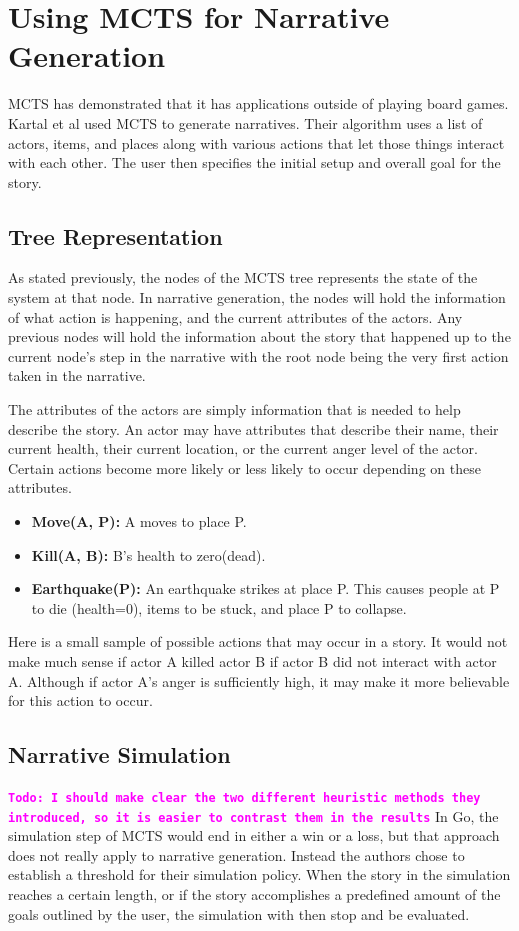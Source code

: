 \documentclass{sig-alternate}
\newcommand{\comment}[1]{{\bf \tt  {#1}}}
\newcommand{\todo}[1]{\textcolor{magenta}{\comment{Todo: {#1}}}}
\begin{document}
\section{Using MCTS for Narrative Generation}
MCTS has demonstrated that it has applications outside of playing board games. Kartal et al\cite{Narrative} used MCTS to generate narratives. Their algorithm uses a list of actors, items, and places along with various actions that let those things interact with each other. The user then specifies the initial setup and overall goal for the story.

\subsection{Tree Representation}
As stated previously, the nodes of the MCTS tree represents the state of the system at that node. In narrative generation, the nodes will hold the information of what action is happening, and the current attributes of the actors. Any previous nodes will hold the information about the story that happened up to the current node's step in the narrative with the root node being the very first action taken in the narrative.

The attributes of the actors are simply information that is needed to help describe the story. An actor may have attributes that describe their name, their current health, their current location, or the  current anger level of the actor. Certain actions become more likely or less likely to occur depending on these attributes.

\begin{itemize}
\item \textbf{Move(A, P):} A moves to place P.
\item \textbf{Kill(A, B):} B's health to zero(dead).
\item \textbf{Earthquake(P):} An earthquake strikes at place P. This causes people at P to die (health=0), items to be stuck, and place P to collapse.
\end{itemize}

Here is a small sample of possible actions that may occur in a story. It would not make much sense if actor A killed actor B if actor B did not interact with actor A. Although if actor A's anger is sufficiently high, it may make it more believable for this action to occur\cite{Narrative}.

\subsection{Narrative Simulation}
\todo{I should make clear the two different heuristic methods they introduced, so it is easier to contrast them in the results}
In Go, the simulation step of MCTS would end in either a win or a loss, but that approach does not really apply to narrative generation. Instead the authors chose to establish a threshold for their simulation policy. When the story in the simulation reaches a certain length, or if the story accomplishes a predefined amount of the goals outlined by the user, the simulation with then stop and be evaluated.
\end{document}

